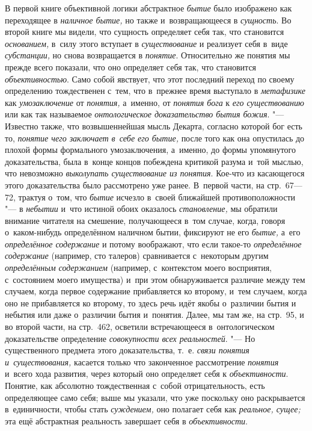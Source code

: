 В первой книге объективной логики абстрактное {\em бытие} было
изображено как переходящее в {\em наличное бытие,} но
также и~возвращающееся в {\em сущность}. Во второй
книге мы видели, что сущность определяет себя так, что становится
{\em основанием,} в~силу этого вступает в {\em существование}
и реализует себя в~виде {\em субстанции,} но
снова возвращается в {\em понятие}.
Относительно же понятия мы прежде всего показали, что оно
определяет себя так, что становится {\em объективностью}.
Само собой явствует, что этот последний переход по своему
определению тождественен с~тем, что в~прежнее время выступало в
{\em метафизике} как {\em умозаключение} от {\em понятия,} а~именно,
от {\em понятия бога} к {\em его существованию} или как так называемое
{\em онтологическое доказательство бытия
божия}. "--- Известно также, что возвышеннейшая мысль Декарта,
согласно которой бог есть то, {\em понятие чего заключает в~себе его
бытие,} после того как она опустилась до плохой формы
формального умозаключения, а~именно, до формы упомянутого доказательства,
была в~конце концов побеждена критикой разума и~той мыслью, что невозможно
{\em выколупать существование из
понятия}. Кое-что из касающегося этого доказательства было
рассмотрено уже ранее. В~первой части, на стр.~67---72, трактуя о~том, что
{\em бытие} исчезло в~своей ближайшей противоположности "--- в
{\em небытии} и~что истиной обоих оказалось {\em становление,} мы
обратили внимание читателя на смешение, получающееся в~том случае, когда,
говоря о~каком-нибудь определённом наличном бытии, фиксируют не его
{\em бытие,} а~его {\em определённое содержание}
и потому воображают, что если такое-то {\em определённое содержание}
(например, сто талеров) сравнивается с~некоторым другим
{\em определённым содержанием}
(например, с~контекстом моего восприятия, с~состоянием моего
имущества) и~при этом обнаруживается различие между тем случаем, когда
первое содержание прибавляется ко второму, и~тем случаем, когда оно не
прибавляется ко второму, то здесь речь идёт якобы о~различии бытия и
небытия или даже о~различии бытия и~понятия. Далее, мы там же, на стр.~95,
и во второй части, на стр.~462, осветили встречающееся в~онтологическом
доказательстве определение {\em совокупности всех реальностей}. "---
Но существенного предмета этого доказательства, т.~е.
{\em связи понятия и~существования,}
касается только что законченное рассмотрение {\em понятия} и~всего
хода развития, через который оно определяет себя к {\em объективности}.
Понятие, как абсолютно тождественная с~собой отрицательность,
есть определяющее само себя; выше мы указали, что уже поскольку оно
раскрывается в~единичности, чтобы стать {\em суждением,} оно
полагает себя как {\em реальное, сущее;} эта ещё
абстрактная реальность завершает себя в {\em объективности}.

